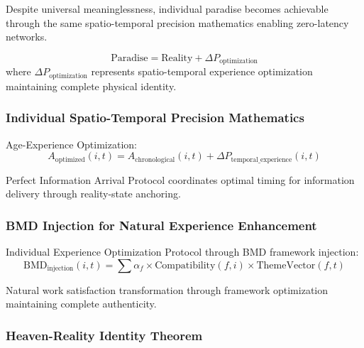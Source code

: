 ﻿\documentclass[11pt,a4paper]{article}
\begin{document}
\begin{itemize}
\begin{itemize}
Despite universal meaninglessness, individual paradise becomes achievable through the same spatio-temporal precision mathematics enabling zero-latency networks.

\begin{definition}
\begin{equation}
\text{Paradise} = \text{Reality} + \Delta P_{\text{optimization}}
\end{equation}
where $\Delta P_{\text{optimization}}$ represents spatio-temporal experience optimization maintaining complete physical identity.
\end{definition}

\subsubsection{Individual Spatio-Temporal Precision Mathematics}

Age-Experience Optimization:
\begin{equation}
A_{\text{optimized}}(i,t) = A_{\text{chronological}}(i,t) + \Delta P_{\text{temporal\_experience}}(i,t)
\end{equation}

Perfect Information Arrival Protocol coordinates optimal timing for information delivery through reality-state anchoring.

\subsubsection{BMD Injection for Natural Experience Enhancement}

Individual Experience Optimization Protocol through BMD framework injection:
\begin{equation}
\text{BMD}_{\text{injection}}(i,t) = \sum \alpha_f \times \text{Compatibility}(f,i) \times \text{ThemeVector}(f,t)
\end{equation}

Natural work satisfaction transformation through framework optimization maintaining complete authenticity.

\subsubsection{Heaven-Reality Identity Theorem}


\end{itemize}
\end{itemize}
\end{document}
